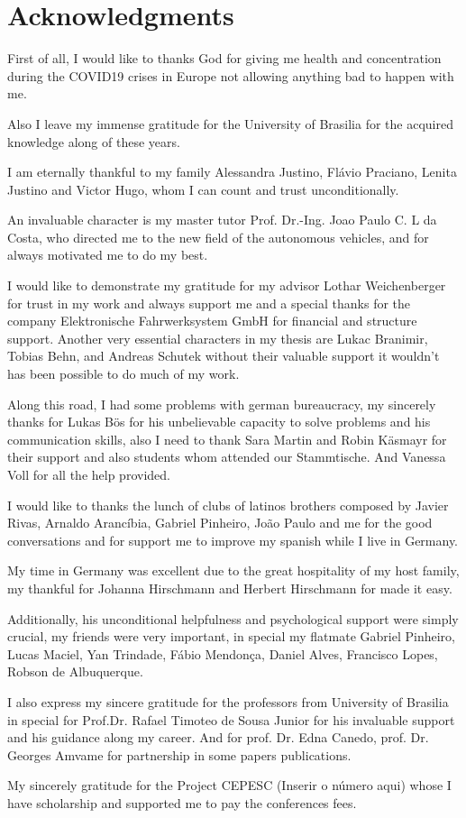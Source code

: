 \chapter*{Acknowledgments}

First of all, I would like to thanks God for giving me health and concentration during the COVID19 crises in Europe not allowing anything bad to happen with me.

Also I leave my immense gratitude for the University of Brasilia for the acquired knowledge along of these years.


I am eternally thankful to my family Alessandra Justino, Flávio Praciano, Lenita Justino and Victor Hugo, whom I can count and trust unconditionally.

An invaluable character is my master tutor Prof. Dr.-Ing. Joao Paulo C. L da Costa, who directed me to the new field of the autonomous vehicles, and for always motivated me to do my best.

I would like to demonstrate my gratitude for my advisor Lothar Weichenberger for trust in my work and always support me and a special thanks for the company Elektronische Fahrwerksystem GmbH for financial and structure support. Another very essential characters in my thesis are Lukac Branimir, Tobias Behn, and Andreas Schutek without their valuable support 
it wouldn't has been possible to do much of my work.

Along this road, I had some problems with german bureaucracy, my sincerely thanks for Lukas Bös for his unbelievable capacity to solve problems and his communication skills, also I need to thank Sara Martin and Robin Käsmayr for their support and also students whom attended our Stammtische. And Vanessa Voll for all the help provided.

I would like to thanks the lunch of clubs of latinos brothers composed by Javier Rivas, Arnaldo Arancíbia, Gabriel Pinheiro, João Paulo and me for the good conversations and for support me to improve my spanish while I live in Germany.

My time in Germany was excellent due to the great hospitality of my host family, my thankful for Johanna Hirschmann and Herbert Hirschmann for made it easy. 

Additionally, his unconditional helpfulness and psychological support were simply
crucial, my friends were very important, in special my flatmate Gabriel Pinheiro, Lucas Maciel, Yan Trindade, Fábio Mendonça, Daniel Alves, Francisco Lopes, Robson de Albuquerque. 

I also express my sincere gratitude for the professors from University of Brasilia in special for Prof.Dr. Rafael Timoteo de Sousa Junior for his invaluable support and his guidance along my career. And for prof. Dr. Edna Canedo, prof. Dr. Georges Amvame for partnership in some papers publications.

My sincerely gratitude for the Project CEPESC (Inserir o número aqui) whose I have scholarship and supported me to pay the conferences fees.
